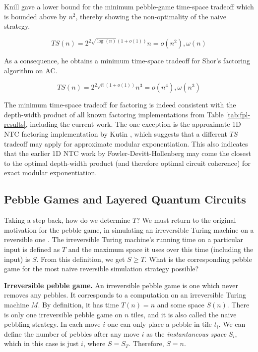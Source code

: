 Knill gave a lower bound for the minimum pebble-game time-space tradeoff
\cite{Knill1995} which is bounded above by $n^2$, thereby showing the
non-optimality of the naive strategy.

\begin{equation}
TS(n) = 2^{2\sqrt{\log(n)}(1 + o(1))}n = o(n^2), \omega(n)
\end{equation}

As a consequence, he obtains a minimum time-space tradeoff for
Shor's factoring algorithm on \textsf{AC}.

\begin{equation}
TS(n) = 2^{2\sqrt{n}(1 + o(1))}n^3 = o(n^4), \omega(n^3)
\end{equation}

The minimum time-space tradeoff for factoring is indeed consistent with the depth-width product of all known
factoring implementations from Table \ref{tab:fpl-results}, including
the current work. The one exception is the approximate 1D NTC factoring
implementation by Kutin \cite{Kutin2006}, which suggests that a different
$TS$ tradeoff may apply for approximate modular exponentiation.
This also indicates that the earlier 1D NTC work by Fowler-Devitt-Hollenberg
\cite{Fowler2004} may come the closest to the optimal depth-width product
(and therefore optimal circuit coherence) for
exact modular exponentiation.

\subsection{Pebble Games and Layered Quantum Circuits}
\label{subsec:cohere-pebble-lqc}

Taking a step back, how do we determine $T$? We must return to the original
motivation for the pebble game, in simulating an irreversible Turing machine
on a reversible one \cite{Bennett1989}. The irreversible Turing machine's
running time on a particular input is defined as $T$ and the maximum
space it uses over this time (including the input) is $S$. From this definition,
we get $S \ge T$. What is the corresponding pebble game for the most naive
reversible simulation strategy possible?

\begin{definition}{\textbf{Irreversible pebble game.}}
An irreversible pebble game is one which never removes any pebbles.
It corresponds to a computation on an irreversible Turing machine $M$.
By definition, it has time $T(n) = n$ and some space $S(n)$.
There is only one irreversible pebble game on $n$ tiles, and it is also called
the naive pebbling strategy.
In each move $i$ one can only
place a pebble in tile $t_i$.
We can define the number of pebbles after any move $i$ as the \emph{instantaneous space}
$S_i$, which in this case is just $i$, where $S = S_T$.
Therefore, $S = n$.
\end{definition}

